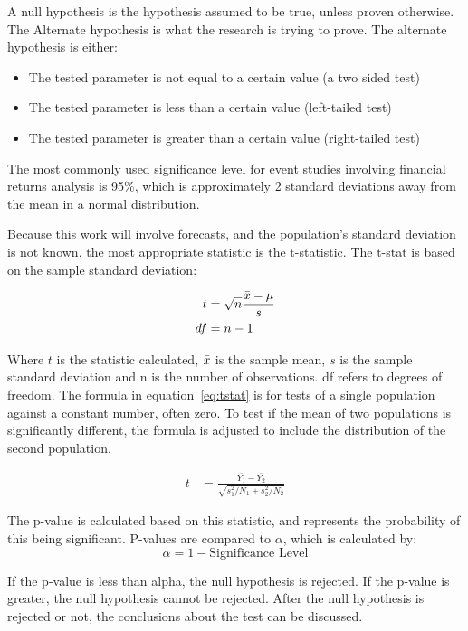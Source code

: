 A null hypothesis is the hypothesis assumed to be true, unless proven otherwise. The Alternate hypothesis is what the research is trying to prove. The alternate hypothesis is either:
\begin{itemize}
    \item The tested parameter is not equal to a certain value (a two sided test)
    \item The tested parameter is less than a certain value (left-tailed test)
    \item The tested parameter is greater than a certain value (right-tailed test)
\end{itemize}

The most commonly used significance level for event studies involving financial returns analysis is 95\%, which is approximately 2 standard deviations away from the mean in a normal distribution.

Because this work will involve forecasts, and the population's standard deviation is not known, the most appropriate statistic is the t-statistic\cite{black_stats}. The t-stat is based on the sample standard deviation:

\begin{align}\label{eq:tstat}
    t &= \sqrt{n}\frac{\Bar{x}-\mu}{s} \\
    df &= n-1 \nonumber
\end{align}

Where $t$ is the statistic calculated, $\Bar{x}$ is the sample mean, $s$ is the sample standard deviation and n is the number of observations. df refers to degrees of freedom. The formula in equation~\ref{eq:tstat} is for tests of a single population against a constant number, often zero. To test if the mean of two populations is significantly different, the formula is adjusted to include the distribution of the second population.

\begin{align}\label{eq:tstat_two}
    t&=\frac{\bar{Y_1}-\bar{Y_2}}{\sqrt{s_{1}^{2}/N_1+s_{2}^{2}/N_2}}
\end{align}

The p-value is calculated based on this statistic, and represents the probability of this being significant. P-values are compared to $\alpha$, which is calculated by:
\begin{equation*}
    \alpha = 1 - \text{Significance Level}
\end{equation*}

If the p-value is less than alpha, the null hypothesis is rejected. If the p-value is greater, the null hypothesis cannot be rejected. After the null hypothesis is rejected or not, the conclusions about the test can be discussed.

